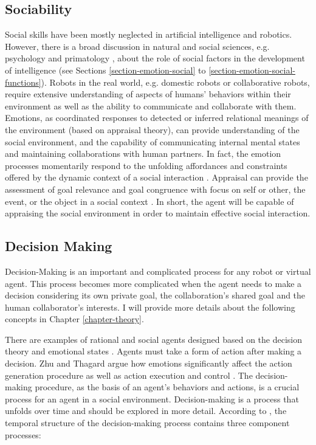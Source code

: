 \documentclass[11pt]{article}
\begin{document}
\subsection{Sociability}
Social skills have been mostly neglected in artificial intelligence and
robotics. However, there is a broad discussion in natural and social sciences,
e.g. psychology and primatology \cite{beheshtifar:social-intelligence-leadership,
bradberry:ability-skill-intelligence, keating:search-social-intelligence,
wexler:emotional-intelligence-appraisal, worden:primate-social-intelligence},
about the role of social factors in the development of intelligence
\cite{dautenhahn:social-autonomous-robots} (see Sections
\ref{section-emotion-social} to \ref{section-emotion-social-functions}). Robots
in the real world, e.g. domestic robots or collaborative robots, require
extensive understanding of aspects of humans' behaviors within their environment
as well as the ability to communicate and collaborate with them. Emotions, as
coordinated responses to detected or inferred relational meanings of the
environment (based on appraisal theory), can provide understanding of the social
environment, and the capability of communicating internal mental states and
maintaining collaborations with human partners. In fact, the emotion processes
momentarily respond to the unfolding affordances and constraints offered by the
dynamic context of a social interaction \cite{parkinson:holds-emotion}.
Appraisal can provide the assessment of goal relevance and goal congruence with
focus on self or other, the event, or the object in a social context
\cite{parrott:appraisal-social-emotions}. In short, the agent will be capable of
appraising the social environment in order to maintain effective social
interaction.

\subsection{Decision Making}

Decision-Making is an important and complicated process for any robot or virtual
agent. This process becomes more complicated when the agent needs to make a
decision considering its own private goal, the collaboration's shared goal and
the human collaborator's interests. I will provide more details about the
following concepts in Chapter \ref{chapter-theory}.

There are examples of rational and social agents designed based on the decision
theory and emotional states \cite{gmytrasiewicz:emotion-agent-decision}. Agents
must take a form of action after making a decision. Zhu and Thagard argue how
emotions significantly affect the action generation procedure as well as action
execution and control \cite{zhu:emotion-action}. The decision-making procedure,
as the basis of an agent's behaviors and actions, is a crucial process for an
agent in a social environment. Decision-making is a process that unfolds over
time and should be explored in more detail. According to
\cite{paulus:emotion-decision-belief}, the temporal structure of the
decision-making process contains three component processes:
\end{document}
